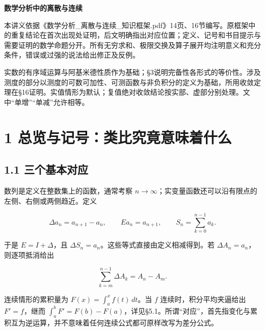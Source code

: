 \documentclass[11pt,a4paper]{article}
\begin{document}
\begin{center}
{\LARGE\bfseries 数学分析中的离散与连续\par}
\vspace{8pt}{\large 性质、联系与差异的完整证明\par}
\vspace{6pt}{\small 2026年11月25日\quad 依原知识框架16节逐项展开\par}
\end{center}
本讲义依据《数学分析\_离散与连续\_知识框架.pdf》14页、16节编写。原框架中的重复结论在首次出现处证明，后文明确指出对应位置；定义、记号和书目提示与需要证明的数学命题分开。所有无穷求和、极限交换及算子展开均注明意义和充分条件，错误或过强的说法给出修正及反例。

实数的有序域运算与阿基米德性质作为基础；§3说明完备性各形式的等价性。涉及测度的部分以测度的可数可加性、可测函数与非负积分的定义为基础，所用收敛定理在§16证明。实值情形为默认；复值绝对收敛结论按实部、虚部分别处理。文中``单增''``单减''允许相等。

\clearpage

\label{contents}\tableofcontents\clearpage

\section{1
总览与记号：类比究竟意味着什么}\label{ux603bux89c8ux4e0eux8bb0ux53f7ux7c7bux6bd4ux7a76ux7adfux610fux5473ux7740ux4ec0ux4e48}

\subsection{1.1
三个基本对应}\label{ux4e09ux4e2aux57faux672cux5bf9ux5e94}

数列是定义在整数集上的函数，通常考察
\(n\to\infty\)；实变量函数还可以沿有限点的左侧、右侧或两侧趋近。定义

\[
\Delta a_n=a_{n+1}-a_n,\qquad Ea_n=a_{n+1},\qquad
S_n=\sum_{k=0}^{n-1}a_k.
\]

于是 \(E=I+\Delta\)，且
\(\Delta S_n=a_n\)。这些等式直接由定义相减得到。若
\(\Delta A_n=a_n\)，则逐项抵消给出

\[
\sum_{k=m}^{n-1}\Delta A_k=A_n-A_m. \tag{1.1}
\]

连续情形的累积量为 \(F(x)=\int_a^x f(t)\,dt\)。当 \(f\)
连续时，积分平均夹逼给出 \(F'=f\)，继而
\(\int_a^bF'=F(b)-F(a)\)，详见§5.1。所谓``对应''，首先指变化与累积互为逆运算，并不意味着任何连续公式都可原样改写为差分公式。
\end{document}
